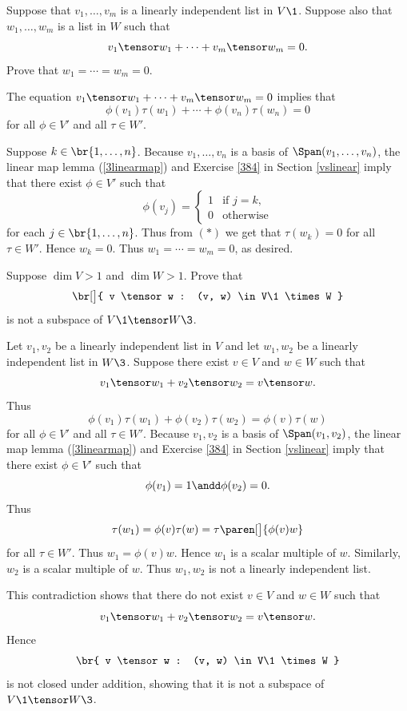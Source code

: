 \exercise
Suppose that $v_1, \ldots, v_m$ is a linearly independent list in $V\1$. Suppose also that $w_1, \ldots, w_m$ is a list in $W$ such that
\[
v_1 \tensor w_1 + \cdots + v_m \tensor w_m = 0.
\]
Prove that $w_1 = \cdots = w_m = 0$.

\begin{Solution}
The equation $v_1 \tensor w_1 + \cdots + v_m \tensor w_m = 0$ implies that
\[
\phi(v_1) \tau(w_1) + \cdots + \phi(v_n) \tau(w_n) = 0 \tag{(*)}
\]
for all $\phi \in V'$ and all $\tau \in W'\!$.

Suppose $k \in \br{1, \ldots, n}$. Because $v_1, \ldots, v_n$ is a basis of $\Span(v_1, \ldots, v_n)$, the linear map lemma (\ref{3linearmap}) and Exercise \ref{384} in Section \ref{vslinear} imply that there exist $\phi \in V'$ such that
\[
\phi(v_j) = \begin{cases}
1 & \text{if } j = k,\\
0 & \text{otherwise}
\end{cases}
\]
for each $j \in \br{1, \ldots, n}$. Thus from $(*)$ we get that $\tau(w_k) = 0$ for all $\tau \in W'\!$. Hence $w_k = 0$.
Thus $w_1 = \cdots = w_m = 0$, as desired.
\end{Solution}

\exercise
Suppose $\dim V > 1$ and $\dim W > 1$. Prove that\label{9VtenW}
\[
\br[\big]{ v \tensor w : (v, w) \in V\1 \times W }
\]
is not a subspace of $V\1 \tensor W\3$.
\vspace{-10bp}

\begin{Solution}
Let $v_1, v_2$ be a linearly independent list in $V$ and let $w_1, w_2$ be a linearly independent list in $W\3$. Suppose there exist $v \in V$ and $w \in W$ such that
\[
v_1 \tensor w_1 + v_2 \tensor w_2 = v \tensor w.
\]
Thus
\[
\phi(v_1)  \tau(w_1) + \phi(v_2) \tau(w_2) = \phi(v) \tau(w)
\]
for all $\phi \in V'$ and all $\tau \in W'\!$. Because $v_1, v_2$ is a basis of $\Span(v_1, v_2)$, the linear map lemma (\ref{3linearmap}) and Exercise \ref{384} in Section \ref{vslinear} imply that there exist $\phi \in V'$ such that
\[
\phi(v_1) = 1 \andd \phi(v_2) = 0.
\]
Thus
\[
\tau(w_1) = \phi(v) \tau(w) = \tau\paren[\big]{ \phi(v) w }
\]
for all $\tau \in W'\!$. Thus $w_1 = \phi(v) w$. Hence $w_1$ is a scalar multiple of $w$. Similarly, $w_2$ is a scalar multiple of $w$. Thus $w_1, w_2$ is not a linearly independent list.

This contradiction shows that there do not exist $v \in V$ and $w \in W$ such that
\[
v_1 \tensor w_1 + v_2 \tensor w_2 = v \tensor w.
\]
Hence
\[
\br{ v \tensor w : (v, w) \in V\1 \times W }
\]
is not closed under addition, showing that it is not a subspace of $V\1 \tensor W\3$.
\end{Solution}

